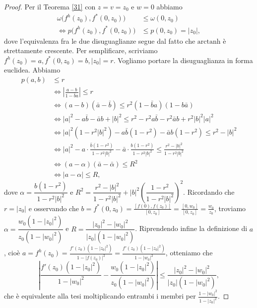 \begin{proof}
  Per il Teorema \ref{31} con $z=v=z_0$ e $w=0$ abbiamo
  \begin{align*}
    \omega\bigl(f^h(z_0),f^*(0,z_0)\bigr) & \le \omega(0,z_0) \\
    \iff p\bigl(f^h(z_0),f^*(0,z_0)\bigr) & \le p(0,z_0)=|z_0|,
  \end{align*}
  dove l'equivalenza fra le due disuguaglianze segue dal fatto che $\text{arctanh}$ è strettamente crescente. Per semplificare, scriviamo $f^h(z_0)=a, f^*(0,z_0)=b, |z_0|=r$. Vogliamo portare la disuguaglianza in forma euclidea. Abbiamo
  \begin{align*}
    p(a,b) & \le r \\
    & \iff \left|\frac{a-b}{1-\bar{b}a}\right| \le r \\
    & \iff (a-b)(\bar{a}-\bar{b}) \le r^2(1-\bar{b}a)(1-b\bar{a}) \\
    & \iff |a|^2-a\bar{b}-\bar{a}b+|b|^2 \le r^2-r^2a\bar{b}-r^2\bar{a}b+r^2|b|^2|a|^2 \\
    & \iff |a|^2(1-r^2|b|^2)-a\bar{b}(1-r^2)-\bar{a}b(1-r^2) \le r^2-|b|^2 \\
    & \iff |a|^2-a\cdot\frac{\bar{b}(1-r^2)}{1-r^2|b|^2}-\bar{a}\cdot\frac{b(1-r^2)}{1-r^2|b|^2} \le \frac{r^2-|b|^2}{1-r^2|b|^2} \\
    & \iff (a-\alpha)(\bar{a}-\bar{\alpha}) \le R^2 \\
    & \iff |a-\alpha| \le R,
  \end{align*}
  dove $\alpha=\dfrac{b(1-r^2)}{1-r^2|b|^2}$ e $R^2=\dfrac{r^2-|b|^2}{1-r^2|b|^2}+|b|^2\left(\dfrac{1-r^2}{1-r^2|b|^2}\right)^2$.
  Ricordando che $r=|z_0|$ e osservando che $b=f^*(0,z_0)=\frac{[f(0),f(z_0)]}{[0,z_0]}=\frac{[0,w_0]}{[0,z_0]}=\frac{w_0}{z_0}$, troviamo $\alpha=\dfrac{w_0(1-|z_0|^2)}{z_0(1-|w_0|^2)}$ e $R=\dfrac{|z_0|^2-|w_0|^2}{|z_0|(1-|w_0|^2)}$.
  Riprendendo infine la definizione di $a$, cioè $a=f^h(z_0)=\frac{f'(z_0)(1-|z_0|^2)}{1-|f(z_0)|^2}=\frac{f'(z_0)(1-|z_0|^2)}{1-|w_0|^2}$, otteniamo che
  $$\left|\frac{f'(z_0)(1-|z_0|^2)}{1-|w_0|^2}-\frac{w_0(1-|z_0|^2)}{z_0(1-|w_0|^2)}\right| \le \frac{|z_0|^2-|w_0|^2}{|z_0|(1-|w_0|^2)},$$
  che è equivalente alla tesi moltiplicando entrambi i membri per $\frac{1-|w_0|^2}{1-|z_0|^2}$.
\end{proof}
